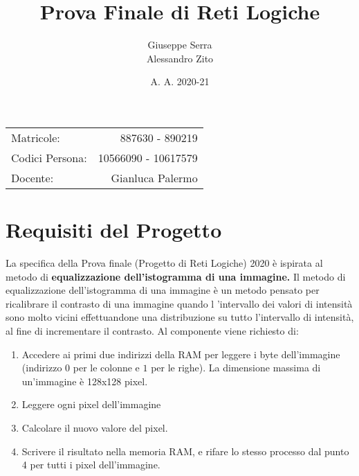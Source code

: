 \documentclass{article}
\title{Prova Finale di Reti Logiche} %
\author{Giuseppe Serra \\ Alessandro Zito} %
\date{A. A. 2020-21}
\begin{document}
\maketitle %
\begin{center}
\begin{tabular}{l r}
Matricole: & 887630 - 890219\\ %
Codici Persona: & 10566090 - 10617579\\
Docente: & Gianluca Palermo %
\end{tabular}
\end{center}

\newpage

\tableofcontents

\newpage







\section{Requisiti del Progetto}


La specifica della Prova finale (Progetto di Reti Logiche) 2020 è ispirata al metodo di \textbf{equalizzazione dell’istogramma di una immagine.}
Il metodo di equalizzazione dell’istogramma di una immagine è un metodo pensato per ricalibrare il contrasto di una immagine quando l ’intervallo dei valori di intensità sono molto vicini effettuandone una distribuzione su tutto l’intervallo di intensità, al fine di incrementare il contrasto. Al componente viene richiesto di:
\begin{enumerate}
\item Accedere ai primi due indirizzi della RAM per leggere i byte dell'immagine (indirizzo $0$ per le colonne e $1$ per le righe). La dimensione massima di un'immagine è 128x128 pixel.
\item Leggere ogni pixel dell'immagine
\item Calcolare il nuovo valore del pixel.
\item Scrivere il risultato nella memoria RAM, e rifare lo stesso processo dal punto 4 per tutti i pixel dell'immagine.
\end{enumerate}
\end{document}
